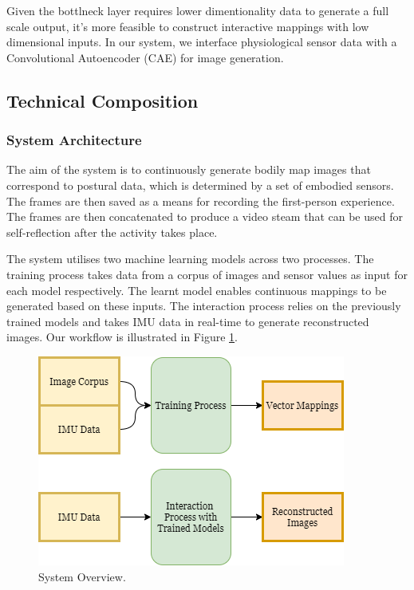 Given the bottlneck layer requires lower dimentionality data to generate a full scale output, it's more feasible to construct interactive mappings with low dimensional inputs. In our system, we interface physiological sensor data with a Convolutional Autoencoder (CAE) for image generation.

\subsection{Technical Composition}

\subsubsection{System Architecture}

The aim of the system is to continuously generate bodily map images that correspond to postural data, which is determined by a set of embodied sensors. The frames are then saved as a means for recording the first-person experience. The frames are then concatenated to produce a video steam that can be used for self-reflection after the activity takes place.

The system utilises two machine learning models across two processes. The training process takes data from a corpus of images and sensor values as input for each model respectively. The learnt model enables continuous mappings to be generated based on these inputs. The interaction process relies on the previously trained models and takes IMU data in real-time to generate reconstructed images. Our workflow is illustrated in Figure \ref{fig:system_overview}.

\begin{figure}[ht]
    \centering
    \includegraphics[width=\textwidth]{Chapters/Figures/modi_dis/Latent-Steps-Architecture.png}
    \caption{System Overview.}
    \label{fig:system_overview}
\end{figure}

